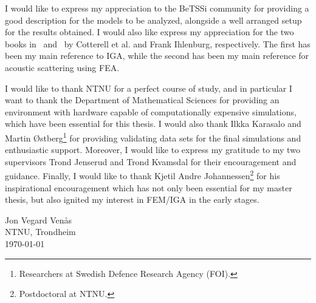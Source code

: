 I would like to express my appreciation to the BeTSSi community for providing a good description for the models to be analyzed, alongside a well arranged setup for the results obtained. I would also like express my appreciation for the two books in~\cite{Cottrell2009iat} and~\cite{Ihlenburg1998fea} by Cotterell et al. and Frank Ihlenburg, respectively. The first has been my main reference to IGA, while the second has been my main reference for acoustic scattering using FEA.

I would like to thank NTNU for a perfect course of study, and in particular I want to thank the Department of Mathematical Sciences for providing an environment with hardware capable of computationally expensive simulations, which have been essential for this thesis. I would also thank Ilkka Karasalo and Martin Østberg\footnote{Researchers at Swedish Defence Research Agency (FOI).}  for providing validating data sets for the final simulations and enthusiastic support. Moreover, I would like to express my gratitude to my two supervisors Trond Jenserud and Trond Kvamsdal for their encouragement and guidance. Finally, I would like to thank Kjetil Andre Johannessen\footnote{Postdoctoral at NTNU.} for his inspirational encouragement which has not only been essential for my master thesis, but also ignited my interest in FEM/IGA in the early stages.
\vspace{2cm}
\begin{flushright}
Jon Vegard Venås\\
NTNU, Trondheim\\
\today
\end{flushright}
